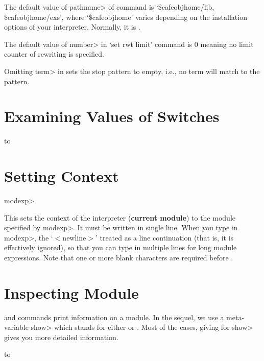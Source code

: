 \documentclass[a4paper,oneside,twocolumn]{memoir}
\begin{document}
The default value of \<pathname> of  command is
`\$cafeobjhome/lib, \$cafeobjhome/exs',
where `\$cafeobjhome' varies depending on the installation options
of your interpreter. Normally, it is .

The default value of \<number> in `set rwt limit' command is 0 meaning
no limit counter of rewriting is specified.

Omitting \<term> in  sets the stop pattern to
empty, i.e., no term will match to the pattern.

\section{Examining Values of Switches}

\paralign to 
\section{Setting Context}

 {\<modexp>}

This sets the context of the interpreter ({\bf current module})
to the module specified by \<modexp>.
It must be written in single line. 
When you type in \<modexp>, the `\kbd{;}$<$newline$>$' treated as a
line continuation (that is, it is effectively ignored), so that you
can type in multiple lines for long module expressions. Note that one
or more blank characters are required before \kbd{;}.

\section{Inspecting Module}

 and  commands print information on a module. 
In the sequel, we use a meta-variable \<show> which stands for
either  or . Most of the cases, 
giving  for \<show> gives you more detailed
information. 

\paralign to 
\end{document}
